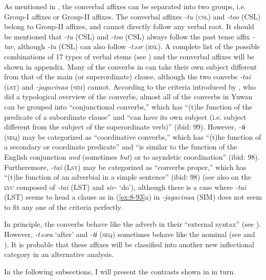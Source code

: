 As mentioned in , the converbal affixes can be separated into two groups, i.e. Group-I affixes or Group-II affixes. The converbal affixes \textit{{}-tu} (\textsc{csl}) and \textit{{}-too} (CSL) belong to Group-II affixes, and cannot directly follow any verbal root. It should be mentioned that \textit{{}-tu} (CSL) and \textit{{}-too} (CSL) always follow the past tense affix \textit{{}-tar}, although \textit{{}-tu} (CSL) can also follow \textit{{}-təər} (\textsc{rsl}). A complete list of the possible combinations of 17 types of verbal stems (see ) and the converbal affixes will be shown in appendix. Many of the converbs in  can take their own subject different from that of the main (or superordinate) clause, although the two convebs \textit{{}-tai} (\textsc{lst}) and \textit{{}-jagacinaa} (\textsc{sim}) cannot. According to the criteria introduced by \citet[98-99]{Nedjalkov1995}, who did a typological overview of the converbs, almost all of the converbs in Yuwan can be grouped into “conjunctional converbs,” which has “(t)he function of the predicate of a subordinate clause” and “can have its own subject (i.e. subject different from the subject of the superordinate verb)” (ibid: 99). However, \textit{{}-tɨ} (\textsc{seq}) may be categorized as “coordinative converbs,” which has “(t)he function of a secondary or coordinate predicate” and “is similar to the function of the English conjunction \textit{and} (sometimes \textit{but}) or to asyndetic coordination” (ibid: 98). Furtheremore, \textit{{}-tai} (L\textsc{st}) may be categorized as “converbs proper,” which has “(t)he function of an adverbial in a simple sentence” (ibid: 98) (see also  on the \textsc{lvc} composed of \textit{{}-tai} (LST) and \textit{sir-} ‘do’), although there is a case where \textit{{}-tai} (LST) seems to head a clause as in (\ref{ex:8-93}a) in  \textit{{}-jagacinaa} (SIM) does not seem to fit any one of the criteria perfectly.

  In principle, the converbs behave like the adverb in their “external syntax” (see ). However, \textit{{}-təəra} ‘after’ and \textit{{}-tɨ} (\textsc{seq}) sometimes behave like the nominal (see  and ). It is probable that these affixes will be classified into another new inflectional category in an alternative analysis.

In the following subsections, I will present the contrasts shown in  in turn.


